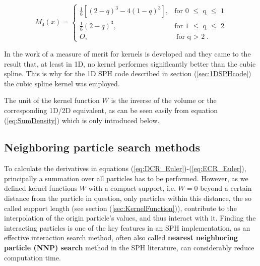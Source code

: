 \documentclass{report}
\begin{document}
\begin{equation}
\label{eq:cubicSpline}
M_{4}(x)=\begin{cases}
\frac{1}{6}[(2-q)^{3}-4(1-q)^{3}],& \text{for 0 $\leq$ q $\leq$ 1} \\
\frac{1}{6}(2-q)^{3},&  \text{for 1 $\leq$ q $\leq$ 2} \\
O,& \text{for q $>$ 2}.
\end{cases}
\end{equation}


In the work of \cite{Fulk1996} a measure of merit for kernels is developed and
they came to the result that, at least in 1D, no kernel performes significantly better
than the cubic spline.
This is why for the 1D SPH code described in section (\ref{sec:1DSPHcode}) the cubic spline kernel was employed.

The unit of the kernel function $W$ is the inverse of the volume or the corresponding 1D/2D equivalent, as can be seen easily from equation (\ref{eq:SumDensity}) which is only introduced below.


\subsection{Neighboring particle search methods}
\label{sec:NNPS}
To calculate the derivatives in equations (\ref{eq:DCR_Euler})-(\ref{eq:ECR_Euler}), principally a
summation over all particles has to be performed. However, as we defined kernel
functions $W$ with a compact support, i.e. $W=0$ beyond a certain distance from the particle in question, only particles within this distance, the so called support length (see section (\ref{sec:KernelFunction})), contribute to the
interpolation of the origin particle's values, and thus interact with it. Finding the interacting
particles is one of the key features in an SPH implementation, as an effective
interaction search method, often also called {\bf nearest neighboring particle (NNP)
search} method in the SPH literature, can considerably reduce
computation time. 
\end{document}
